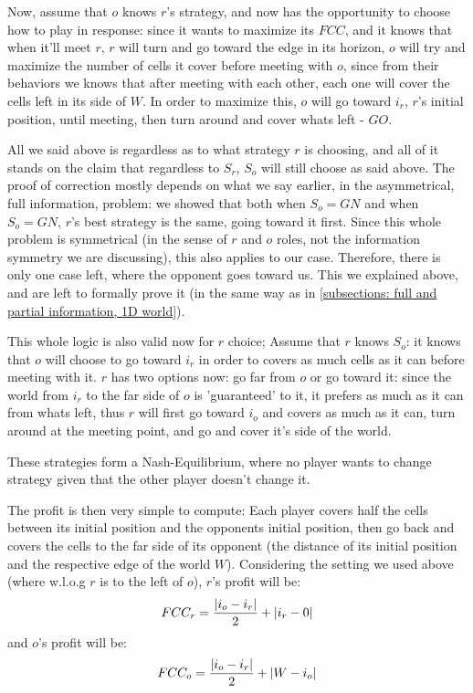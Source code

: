 \documentclass[a4paper,10pt]{article}
\newcommand\rob{\ensuremath{r}\xspace}
\newcommand\opp{\ensuremath{o}\xspace}
\newcommand{\w}{\ensuremath{W}\xspace}
\newcommand{\fcc}{\ensuremath{FCC}\xspace}
\newcommand{\gn}{\ensuremath{GN}\xspace}
\newcommand{\go}{\ensuremath{GO}\xspace}
\DeclarePairedDelimiter\abs{\lvert}{\rvert}%
\begin{document}
Now, assume that \opp knows \rob's strategy, and now has the opportunity to choose how to play in response: since it wants to maximize its \fcc, and it knows that when it'll meet \rob, \rob will turn and go toward the edge in its horizon, \opp will try and maximize the number of cells it cover before meeting with \opp, since from their behaviors we knows that after meeting with each other, each one will cover the cells left in its side of \w. In order to maximize this, \opp will go toward $i_{\rob}$, \rob's initial position, until meeting, then turn around and cover whats left - \go.

All we said above is regardless as to what strategy \rob is choosing, and all of it stands on the claim that regardless to $S_{\rob}$, $S_{\opp}$ will still choose as said above. The proof of correction mostly depends on what we say earlier, in the asymmetrical, full information, problem: we showed that both when $S_{\opp}=\gn$ and when $S_{\opp}=\gn$, \rob's best strategy is the same, going toward it first. Since this whole problem is symmetrical (in the sense of \rob and \opp roles, not the information symmetry we are discussing), this also applies to our case.
Therefore, there is only one case left, where the opponent goes toward us. This we explained above, and are left to formally prove it (in the same way as in \ref{subsections: full and partial information, 1D world}).


This whole logic is also valid now for \rob choice; Assume that \rob knows $S_{\opp}$: it knows that \opp will choose to  go toward $i_{\rob}$ in order to covers as much cells as it can before meeting with it. \rob has two options now: go far from \opp or go toward it: since the world from $i_{\rob}$ to the far side of \opp is 'guaranteed' to it, it prefers as much as it can from whats left, thus \rob will first go toward $i_{\opp}$ and covers as much as it can, turn around at the meeting point, and go and cover it's side of the world.

These strategies form a Nash-Equilibrium, where no player wants to change strategy given that the other player doesn't change it.

The profit is then very simple to compute:
Each player covers half the cells between its initial position and the opponents initial position, then go back and covers the cells to the far side of its opponent (the distance of its initial position and the respective edge of the world \w).
Considering the setting we used above (where w.l.o.g \rob is to the  left of \opp), \rob's profit will be:\[\fcc_r=\frac{\abs*{i_{\opp} - i_{\rob}}}{2}+\abs*{i_{\rob}-0}\] and \opp's profit will be: \[\fcc_{\opp}=\frac{\abs*{i_{\opp} - i_{\rob}}}{2}+\abs*{\w - i_{\opp}}\]
\end{document}
